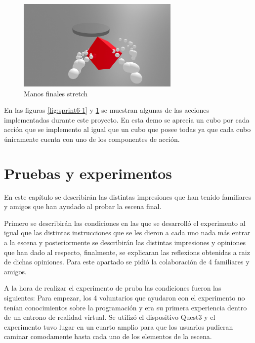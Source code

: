 \documentclass[a4paper, 12pt]{book}
\begin{document}
\begin{figure}[H] 
  \centering
  \includegraphics[width=0.7\textwidth]{img/stretch.jpg} 
  \caption{Manos finales stretch}
  \label{fig:sprint6-2}
\end{figure}

En las figuras \ref{fig:sprint6-1} y \ref{fig:sprint6-2} se muestran algunas de las acciones implementadas durante este proyecto. En esta demo se aprecia un cubo por cada acción que se implemento al igual que un cubo que posee todas ya que cada cubo únicamente cuenta con uno de los componentes de acción.


\cleardoublepage
\chapter{Pruebas y experimentos}
\label{chap:pruebas-experimentos}
En este capítulo se describirán las distintas impresiones que han tenido familiares y amigos que han ayudado al probar la escena final. 

Primero se describirán las condiciones en las que se desarrolló el experimento al igual que las distintas instrucciones que se les dieron a cada uno nada más entrar a la escena y posteriormente se describirán las distintas impresiones y opiniones que han dado al respecto, finalmente, se explicaran las reflexions obtenidas a raiz de dichas opiniones.
Para este apartado se pidió la colaboración de 4 familiares y amigos.

A la hora de realizar el experimento de pruba las condiciones fueron las siguientes: Para empezar, los 4 voluntarios que ayudaron con el experimento no tenían conocimientos sobre la programación y era su primera experiencia dentro de un entrono de realidad virtual. Se utilizó el dispositivo Quest3 y el experimento tuvo lugar en un cuarto amplio para que los usuarios pudieran caminar comodamente hasta cada uno de los elementos de la escena.
\end{document}
